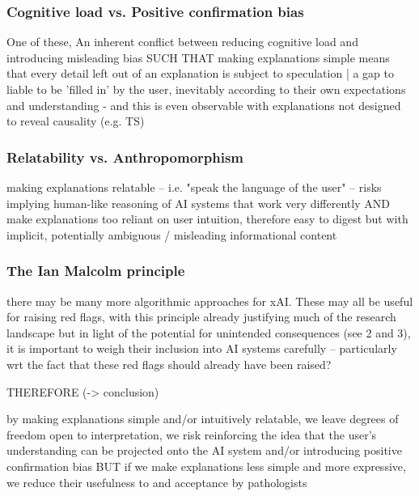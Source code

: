\subsubsection{Cognitive load vs. Positive confirmation bias}

One of these, An inherent conflict between reducing cognitive load and introducing misleading bias
SUCH THAT
making explanations simple means that every detail left out of an explanation is subject to speculation | a gap to liable to be 'filled in' by the user, inevitably according to their own expectations and understanding
- and this is even observable with explanations not designed to reveal causality (e.g. TS)

\subsubsection{Relatability vs. Anthropomorphism}

making explanations relatable -- i.e. "speak the language of the user" -- risks implying human-like reasoning of AI systems that work very differently AND make explanations too reliant on user intuition, therefore easy to digest but with implicit, potentially ambiguous / misleading informational content

\subsubsection{The Ian Malcolm principle}


there may be many more algorithmic approaches for xAI. These may all be useful for raising red flags, with this principle already justifying much of the research landscape but in light of the potential for unintended consequences (see 2 and 3), it is important to weigh their inclusion into AI systems carefully -- particularly wrt the fact that these red flags should already have been raised?

THEREFORE (-> conclusion)

by making explanations simple and/or intuitively relatable, we leave degrees of freedom open to interpretation, we risk reinforcing the idea that the user's understanding can be projected onto the AI system and/or introducing positive confirmation bias 
BUT
if we make explanations less simple and more expressive, we reduce their usefulness to and acceptance by pathologists

